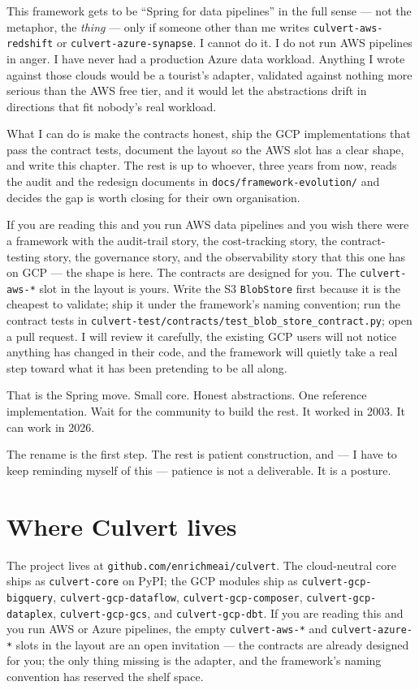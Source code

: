 \documentclass[
  11pt,
  british,
  oneside]{book}
\begin{document}
This framework gets to be ``Spring for data
pipelines'' in the full sense --- not
the metaphor, the \emph{thing} --- only if someone other than me writes
\texttt{culvert-aws-redshift} or \texttt{culvert-azure-synapse}. I
cannot do it. I do not run AWS pipelines in anger. I have never had a
production Azure data workload. Anything I wrote against those clouds
would be a tourist's adapter, validated against nothing more serious
than the AWS free tier, and it would let the abstractions drift in
directions that fit nobody's real workload.

What I can do is make the contracts honest, ship the GCP implementations
that pass the contract tests, document the layout so the AWS slot has a
clear shape, and write this chapter. The rest is up to whoever, three
years from now, reads the audit and the redesign documents in
\texttt{docs/framework-evolution/} and decides the gap is worth closing
for their own organisation.

If you are reading this and you run AWS data pipelines and you wish
there were a framework with the audit-trail story, the cost-tracking
story, the contract-testing story, the governance story, and the
observability story that this one has on GCP --- the shape is here. The
contracts are designed for you. The \texttt{culvert-aws-*} slot in the
layout is yours. Write the S3 \texttt{BlobStore} first because it is the
cheapest to validate; ship it under the framework's naming convention;
run the contract tests in
\texttt{culvert-test/contracts/test\_blob\_store\_contract.py}; open a
pull request. I will review it carefully, the existing GCP users will
not notice anything has changed in their code, and the framework will
quietly take a real step toward what it has been pretending to be all
along.

That is the Spring move. Small core. Honest abstractions. One reference
implementation. Wait for the community to build the rest. It worked in
2003. It can work in 2026.

The rename is the first step. The rest is patient construction, and ---
I have to keep reminding myself of this --- patience is not a
deliverable. It is a posture.

\hypertarget{where-culvert-lives}{%
\section{Where Culvert lives}\label{where-culvert-lives}}

The project lives at
\texttt{github.com/enrichmeai/culvert}. The
cloud-neutral core ships as \texttt{culvert-core} on PyPI; the GCP
modules ship as \texttt{culvert-gcp-bigquery},
\texttt{culvert-gcp-dataflow}, \texttt{culvert-gcp-composer},
\texttt{culvert-gcp-dataplex}, \texttt{culvert-gcp-gcs}, and
\texttt{culvert-gcp-dbt}. If you are
reading this and you run AWS or Azure pipelines, the empty
\texttt{culvert-aws-*} and \texttt{culvert-azure-*} slots in the layout
are an open invitation --- the contracts are already designed for you;
the only thing missing is the adapter, and the framework's naming
convention has reserved the shelf space.
\end{document}
